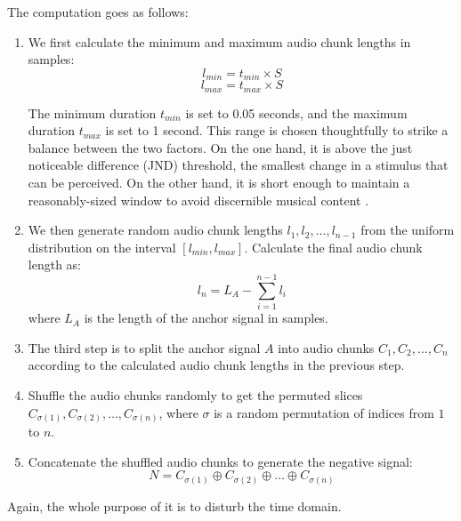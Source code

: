 The computation goes as follows:

\begin{enumerate}
\item We first calculate the minimum and maximum audio chunk lengths in samples:
\begin{equation}
l_{min} = t_{min} \times S
\end{equation}
\begin{equation}
l_{max} = t_{max} \times S
\end{equation}

The minimum duration $t_{min}$ is set to 0.05 seconds, and the maximum duration $t_{max}$ is set to 1 second. This range is chosen thoughtfully to strike a balance between the two factors. On the one hand, it is above the just noticeable difference (JND) threshold, the smallest change in a stimulus that can be perceived. On the other hand, it is short enough to maintain a reasonably-sized window to avoid discernible musical content \cite{Fastl2007Just-NoticeableChanges}.

\item We then generate random audio chunk lengths $l_1, l_2, \ldots, l_{n-1}$ from the uniform distribution on the interval $[l_{min}, l_{max}]$. Calculate the final audio chunk length as:
\begin{equation}
l_n = L_A - \sum_{i=1}^{n-1} l_i
\end{equation}
where $L_A$ is the length of the anchor signal in samples.

\item The third step is to split the anchor signal $A$ into audio chunks $C_1, C_2, \ldots, C_n$ according to the calculated audio chunk lengths in the previous step.

\item Shuffle the audio chunks randomly to get the permuted slices $C_{\sigma(1)}, C_{\sigma(2)}, \ldots, C_{\sigma(n)}$, where $\sigma$ is a random permutation of indices from $1$ to $n$. 

\item Concatenate the shuffled audio chunks to generate the negative signal:
\begin{equation}\label{eq:negative_signal}
N = C_{\sigma(1)} \oplus C_{\sigma(2)} \oplus \ldots \oplus C_{\sigma(n)}
\end{equation}
\end{enumerate}

Again, the whole purpose of it is to disturb the time domain.

